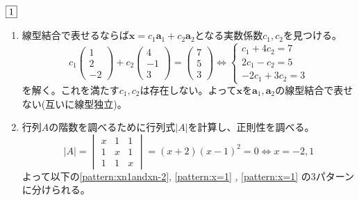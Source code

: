 \documentclass[dvipdfmx]{jsreport}
\begin{document}
\begin{souanswer} %
	$\fbox{1}$
\begin{enumerate}
	\item 線型結合で表せるならば$\bm{x}= c_1\bm{a}_1+ c_2\bm{a}_2$となる実数係数$c_1, c_2$を見つける。
\begin{equation*}
	c_1\begin{pmatrix}1\\ 2\\ -2\end{pmatrix}+ c_2\begin{pmatrix}4\\ -1\\ 3\end{pmatrix}= \begin{pmatrix}7\\ 5\\ 3\end{pmatrix}
	\iff
	\begin{cases}
		c_1+ 4c_2= 7\\
		2c_1- c_2= 5\\
		-2c_1+ 3c_2= 3
	\end{cases}
\end{equation*}
	を解く。これを満たす$c_1, c_2$は存在しない。よって$\bm{x}$を$\bm{a}_1, \bm{a}_2$の線型結合で表せない(互いに線型独立)。
	\item 行列$A$の階数を調べるために行列式$|A|$を計算し、正則性を調べる。
\begin{equation*}
	|A|= \begin{vmatrix}x& 1& 1\\ 1& x& 1\\ 1& 1& x\end{vmatrix}= (x+2)(x-1)^2= 0\iff x= -2, 1
\end{equation*}
	よって以下の\ref{pattern:xn1andxn-2}, \ref{pattern:x=1} , \ref{pattern:x=1} の3パターンに分けられる。
\end{enumerate}
\end{souanswer}
\end{document}
